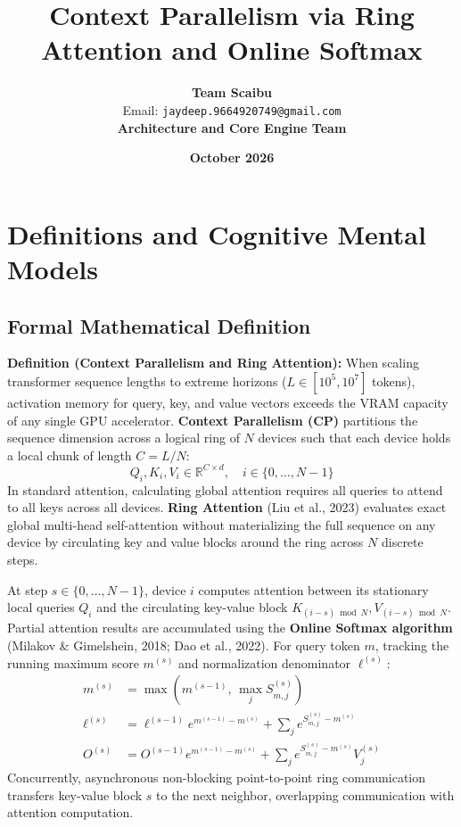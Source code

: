 \documentclass[11pt,a4paper]{article}
\title{\textbf{Context Parallelism via Ring Attention and Online Softmax}}
\author{\textbf{Team Scaibu} \\ \small Email: \texttt{jaydeep.9664920749@gmail.com} \\ \small \textbf{Architecture and Core Engine Team}}
\date{\textbf{October 2026}}
\theoremstyle{definition}
\begin{document}
\maketitle

\section{Definitions and Cognitive Mental Models}

\subsection{Formal Mathematical Definition}
\textbf{Definition (Context Parallelism and Ring Attention):}
When scaling transformer sequence lengths to extreme horizons ($L \in [10^5, 10^7]$ tokens), activation memory for query, key, and value vectors exceeds the VRAM capacity of any single GPU accelerator. \textbf{Context Parallelism (CP)} partitions the sequence dimension across a logical ring of $N$ devices such that each device holds a local chunk of length $C = L / N$:
{\boldmath
\begin{equation}
Q_i, K_i, V_i \in \mathbb{R}^{C \times d}, \quad i \in \{0, \dots, N-1\}
\end{equation}
}
In standard attention, calculating global attention requires all queries to attend to all keys across all devices. \textbf{Ring Attention} (Liu et al., 2023) evaluates exact global multi-head self-attention without materializing the full sequence on any device by circulating key and value blocks around the ring across $N$ discrete steps.

At step $s \in \{0, \dots, N-1\}$, device $i$ computes attention between its stationary local queries $Q_i$ and the circulating key-value block $K_{(i-s) \bmod N}, V_{(i-s) \bmod N}$. Partial attention results are accumulated using the \textbf{Online Softmax algorithm} (Milakov \& Gimelshein, 2018; Dao et al., 2022). For query token $m$, tracking the running maximum score $m^{(s)}$ and normalization denominator $\ell^{(s)}$:
{\boldmath
\begin{align}
m^{(s)} &= \max\left( m^{(s-1)}, \, \max_j S_{m, j}^{(s)} \right) \\
\ell^{(s)} &= \ell^{(s-1)} e^{m^{(s-1)} - m^{(s)}} + \sum_j e^{S_{m, j}^{(s)} - m^{(s)}} \\
O^{(s)} &= O^{(s-1)} e^{m^{(s-1)} - m^{(s)}} + \sum_j e^{S_{m, j}^{(s)} - m^{(s)}} V_j^{(s)}
\end{align}
}
Concurrently, asynchronous non-blocking point-to-point ring communication transfers key-value block $s$ to the next neighbor, overlapping communication with attention computation.
\end{document}
